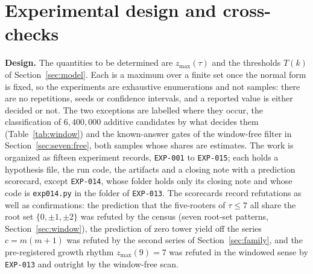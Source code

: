 \documentclass[11pt]{article}
\theoremstyle{definition}
\theoremstyle{remark}
\newcommand{\zmax}{z_{\max}}
\begin{document}
\section{Experimental design and cross-checks}\label{sec:design}

\textbf{Design.} The quantities to be determined are $\zmax(\tau)$ and the thresholds $T(k)$ of
Section~\ref{sec:model}. Each is a maximum over a finite set once the normal form is fixed, so
the experiments are exhaustive enumerations and not samples: there are no repetitions, seeds or
confidence intervals, and a reported value is either decided or not. The two exceptions are labelled
where they occur, the classification of $6{,}400{,}000$ additive candidates by what decides
them (Table~\ref{tab:window}) and the known-answer gates of the window-free filter in
Section~\ref{sec:seven:free}, both samples whose shares are estimates. The work is organized as fifteen experiment
records, \texttt{EXP-001} to \texttt{EXP-015}; each holds a hypothesis file, the run code, the artifacts and a
closing note with a prediction scorecard, except \texttt{EXP-014}, whose folder holds only its closing note and whose
code is \texttt{exp014.py} in the folder of \texttt{EXP-013}. The scorecards record refutations as well as confirmations:
the prediction that the five-rooters of $\tau \le 7$ all share the root set $\{0,\pm1,\pm2\}$
was refuted by the census (seven root-set patterns, Section~\ref{sec:window}), the prediction of
zero tower yield off the series $c = m(m+1)$ was refuted by the second series of
Section~\ref{sec:family}, and the pre-registered growth rhythm $\zmax(9) = 7$ was refuted in the windowed sense by
\texttt{EXP-013} and outright by the window-free scan.
\end{document}

